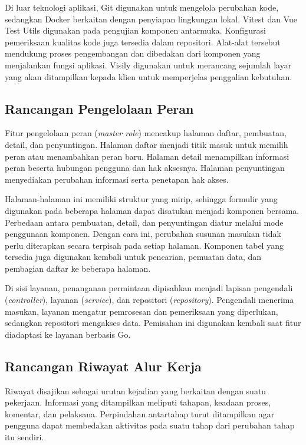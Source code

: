 Di luar teknologi aplikasi, Git digunakan untuk mengelola perubahan kode, sedangkan Docker berkaitan dengan penyiapan lingkungan lokal. Vitest dan Vue Test Utils digunakan pada pengujian komponen antarmuka. Konfigurasi pemeriksaan kualitas kode juga tersedia dalam repositori. Alat-alat tersebut mendukung proses pengembangan dan dibedakan dari komponen yang menjalankan fungsi aplikasi. Visily digunakan untuk merancang sejumlah layar yang akan ditampilkan kepada klien untuk memperjelas penggalian kebutuhan.

\subsection{Rancangan Pengelolaan Peran}
Fitur pengelolaan peran (\textit{master role}) mencakup halaman daftar, pembuatan, detail, dan penyuntingan. Halaman daftar menjadi titik masuk untuk memilih peran atau menambahkan peran baru. Halaman detail menampilkan informasi peran beserta hubungan pengguna dan hak aksesnya. Halaman penyuntingan menyediakan perubahan informasi serta penetapan hak akses.

Halaman-halaman ini memiliki struktur yang mirip, sehingga formulir yang digunakan pada beberapa halaman dapat disatukan menjadi komponen bersama. Perbedaan antara pembuatan, detail, dan penyuntingan diatur melalui mode penggunaan komponen. Dengan cara ini, perubahan susunan masukan tidak perlu diterapkan secara terpisah pada setiap halaman. Komponen tabel yang tersedia juga digunakan kembali untuk pencarian, pemuatan data, dan pembagian daftar ke beberapa halaman.

Di sisi layanan, penanganan permintaan dipisahkan menjadi lapisan pengendali (\textit{controller}), layanan (\textit{service}), dan repositori (\textit{repository}). Pengendali menerima masukan, layanan mengatur pemrosesan dan pemeriksaan yang diperlukan, sedangkan repositori mengakses data. Pemisahan ini digunakan kembali saat fitur diadaptasi ke layanan berbasis Go.

\subsection{Rancangan Riwayat Alur Kerja}
Riwayat disajikan sebagai urutan kejadian yang berkaitan dengan suatu pekerjaan. Informasi yang ditampilkan meliputi tahapan, keadaan proses, komentar, dan pelaksana. Perpindahan antartahap turut ditampilkan agar pengguna dapat membedakan aktivitas pada suatu tahap dari perubahan tahap itu sendiri.

